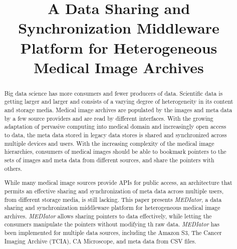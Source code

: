 \documentclass[conference]{IEEEtran}
\begin{document}
\title{A Data Sharing and Synchronization Middleware Platform for Heterogeneous Medical Image Archives}

\author{
\and
{}
}
\maketitle

\begin{abstract}
Big data science has more consumers and fewer producers of data. Scientific data is getting larger and larger and consists of a varying degree of heterogeneity in its content and storage media. Medical image archives are populated by the images and meta data by a few source providers and are read by different interfaces. With the growing adaptation of pervasive computing into medical domain and increasingly open access to data, the meta data stored in legacy data stores is shared and synchronized across multiple devices and users. With the increasing complexity of the medical image hierarchies, consumers of medical images should be able to bookmark pointers to the sets of images and meta data from different sources, and share the pointers with others. 

While many medical image sources provide APIs for public access, an architecture that permits an effective sharing and synchronization of meta data across multiple users, from different storage media, is still lacking. This paper presents \textit{MEDIator}, a data sharing and synchronization middleware platform for heterogeneous medical image archives. \textit{MEDIator} allows sharing pointers to data effectively, while letting the consumers manipulate the pointers without modifying th raw data. \textit{MEDIator} has been implemented for multiple data sources, including the Amazon S3, The Cancer Imaging Archive (TCIA), CA Microscope, and meta data from CSV files.
\end{abstract}
\end{document}

